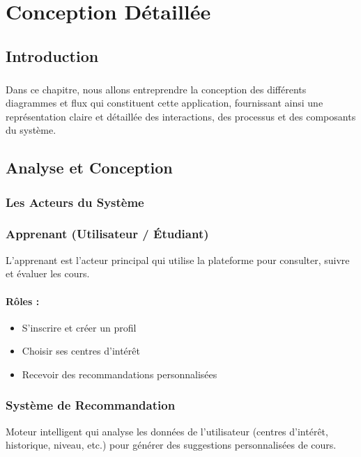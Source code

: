 \chapter{Conception Détaillée}

\section*{Introduction}
{}

\paragraph{}\begin{spacing}{2}
Dans ce chapitre, nous allons entreprendre la conception des différents diagrammes et
flux qui constituent cette application, fournissant ainsi une représentation claire et détaillée
des interactions, des processus et des composants du système.
\end{spacing}
\newpage
\section{Analyse et Conception}
\subsection{Les Acteurs du Système}
\subsection*{Apprenant (Utilisateur / Étudiant)}
L’apprenant est l’acteur principal qui utilise la plateforme pour consulter, suivre et évaluer les cours.

\subsubsection*{Rôles :}
\begin{itemize}
    \item S’inscrire et créer un profil
    \item Choisir ses centres d’intérêt  
    \item Recevoir des recommandations personnalisées
\end{itemize}
\subsection*{Système de Recommandation}
Moteur intelligent qui analyse les données de l’utilisateur (centres d’intérêt, historique, niveau, etc.) pour générer des suggestions personnalisées de cours.

